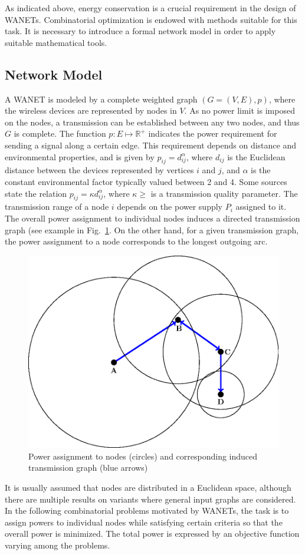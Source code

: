 As indicated above, energy conservation is a crucial requirement in the design of WANETs. 
Combinatorial optimization is endowed with methods suitable for this task. 
It is necessary to introduce a formal network model in order to apply suitable mathematical tools.

\subsection{Network Model}

A WANET is modeled by a complete weighted graph $(G=(V,E),p)$, where the wireless devices are represented by nodes in $V$. 
As no power limit is imposed on the nodes, a transmission can be established between any two nodes, and thus $G$ is complete.
The function $p:E\mapsto \mathbb{R}^+$ indicates the power requirement for sending a signal along a certain edge.
This requirement depends on distance and environmental properties, and is given by  $p_{ij}=d_{ij}^\alpha$, 
where $d_{ij}$ is the Euclidean distance between the devices represented by vertices $i$ and $j$, and $\alpha$ is the constant environmental factor typically valued between 2 and 4. 
Some sources state the relation $p_{ij}=\kappa d_{ij}^\alpha$, where $\kappa\geq$ is a transmission quality parameter.
The transmission range of a node $i$ depends on the power supply $P_i$ assigned to it.
The overall power assignment to individual nodes induces a directed transmission graph (see example in Fig.~\ref{fig:transgraph}. 
On the other hand, for a given transmission graph, the power assignment to a node corresponds to the longest outgoing arc.
\begin{figure}[htb!]
  \centering
  \includegraphics[scale=.8]{figurer/tran-graph.eps}
  \caption{Power assignment to nodes (circles)  and corresponding induced transmission graph (blue arrows)}
  \label{fig:transgraph}
\end{figure}
It is usually assumed that nodes are distributed in a Euclidean space, although there are multiple results on variants where general input graphs are considered.
In the following combinatorial problems motivated by WANETs, the task is to assign powers to individual nodes while satisfying certain criteria so that the overall power is minimized.
The total power is expressed by an objective function varying among the problems.

